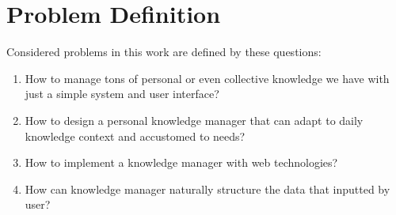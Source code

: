 \section{Problem Definition}
\label{sec:problem-definition}

Considered problems in this work are defined by these questions:

\begin{enumerate}
\item How to manage tons of personal or even collective knowledge we have with just a simple system and user interface?
\item How to design a personal knowledge manager that can adapt to daily knowledge context and accustomed to needs?
\item How to implement a knowledge manager with web technologies?
\item How can knowledge manager naturally structure the data that inputted by user?
\end{enumerate}

